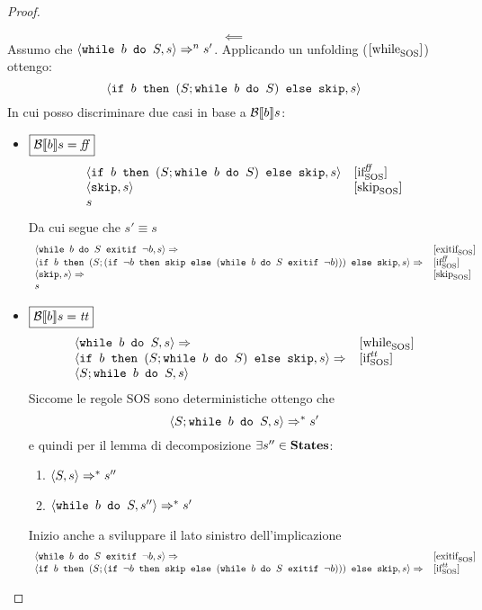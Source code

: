 \begin{enumerate}
\begin{proof}
\begin{itemize}
\end{itemize}
$$
\boxed{\impliedby}
$$
Assumo che $\confSs{\wbS{b}{S}}{s} \Rar{n} s'$. Applicando un unfolding
($\whileSOS$) ottengo:
$$
\confSs{\ifABC{b}{(S; \wbS{b}{S})}{\skipForFriends}}{s}
$$
In cui posso discriminare due casi in base a $\B{b}$:
\begin{itemize}
\item $\boxed{\B{b} = \semfalse}$
$$
\begin{array}{ll}
\confSs{\ifABC{b}{(S; \wbS{b}{S})}{\skipForFriends}}{s} & \ifffSOS\\
\confSs{\skipForFriends}{s} & \skipSOS\\
s & \\
\end{array}
$$
Da cui segue che $\boxed{s' \equiv{ } s}$
$$
\begin{array}{ll}
\confSs{\wbSE{b}{S}{\neg b}}{s} \Rar{ } & \exitifSOS\\
\confSs{\ifABC{b}{(S; (\ifABC{\neg b}{\skipForFriends}{(\wbSE{b}{S}{\neg b})}))}{\skipForFriends}}{s} \Rar{} & \ifffSOS \\
\confSs{\skipForFriends}{s} \Rar{}& \skipSOS\\
s & \\
\end{array}
$$
\item $\boxed{\B{b} = \semtrue}$
$$
\begin{array}{ll}
\confSs{\wbS{b}{S}}{s} \Rar{} & \whileSOS \\
\confSs{\ifABC{b}{(S; \wbS{b}{S})}{\skipForFriends}}{s} \Rar{} & \ifttSOS\\
\confSs{S; \wbS{b}{S}}{s} & \\
\end{array}
$$
Siccome le regole SOS sono deterministiche ottengo che
$$
\confSs{S; \wbS{b}{S}}{s} \Rar{*} s'
$$
e quindi per il lemma di decomposizione $\exists s''\in\states$:
\begin{enumerate}
\item 
$\confSs{S}{s} \Rar{*} s''$
\label{hw6:FattoA}
\item $\confSs{\wbS{b}{S}}{s''} \Rar{*} s' $
\label{hw6:FattoB}
\end{enumerate}
Inizio anche a sviluppare il lato sinistro dell'implicazione
$$
\begin{array}{ll}
	\confSs{\wbSE{b}{S}{\neg b}}{s} \Rar{ } & \exitifSOS\\
	\confSs{\ifABC{b}{(S; (\ifABC{\neg b}{\skipForFriends}{(\wbSE{b}{S}{\neg b})}))}{\skipForFriends}}{s} \Rar{} & \ifttSOS \\

\end{array}$$
\end{itemize}
\end{proof}
\end{enumerate}
